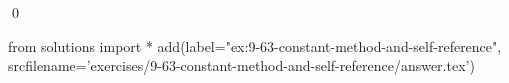 
\begin{ex}
  \label{ex:9-63-constant-method-and-self-reference}
  
  \qed
\end{ex}
\begin{python0}
from solutions import *
add(label="ex:9-63-constant-method-and-self-reference",
    srcfilename='exercises/9-63-constant-method-and-self-reference/answer.tex')
\end{python0}
